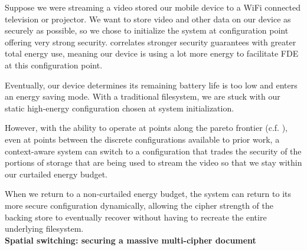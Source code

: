   Suppose we were streaming a video stored our mobile
device to a WiFi connected television or projector. We want to store video and
other data on our device as securely as possible, so we chose to initialize the
system at configuration point offering very strong security.
 correlates stronger security guarantees with
greater total energy use, meaning our device is using a lot more energy to
facilitate FDE at this configuration point.

Eventually, our device determines its remaining battery life is too low and
enters an energy saving mode. With a traditional filesystem, we are stuck with
our static high-energy configuration chosen at system initialization.

However, with the ability to operate at points along the pareto frontier (c.f.
), even at points between the discrete
configurations available to prior work, a context-aware system can switch to a
configuration that trades the security of the portions of storage that are being
used to stream the video so that we stay within our curtailed energy budget.

When we return to a non-curtailed energy budget, the system can return to its
more secure configuration dynamically, allowing the cipher strength of the
backing store to eventually recover without having to recreate the entire
underlying filesystem.\\

\noindent
\textbf{Spatial switching: securing a massive multi-cipher document}


